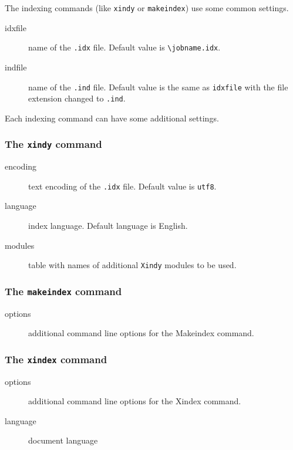The indexing commands (like \texttt{xindy} or \texttt{makeindex}) use
some common settings.

\begin{description}
\item[idxfile]
name of the \texttt{.idx} file. Default value is
\texttt{\textbackslash{}jobname.idx}.
\item[indfile]
name of the \texttt{.ind} file. Default value is the same as
\texttt{idxfile} with the file extension changed to \texttt{.ind}.
\end{description}

Each indexing command can have some additional settings.

\subsubsection{\texorpdfstring{The \texttt{xindy}
command}{The xindy command}}\label{the-xindy-command}

\begin{description}
\item[encoding]
text encoding of the \texttt{.idx} file. Default value is \texttt{utf8}.
\item[language]
index language. Default language is English.
\item[modules]
table with names of additional \texttt{Xindy} modules to be used.
\end{description}

\subsubsection{\texorpdfstring{The \texttt{makeindex}
command}{The makeindex command}}\label{the-makeindex-command}

\begin{description}
\item[options]
additional command line options for the Makeindex command.
\end{description}

\subsubsection{\texorpdfstring{The \texttt{xindex}
command}{The xindex command}}\label{the-xindex-command}

\begin{description}
\item[options]
additional command line options for the Xindex command.
\item[language]
document language
\end{description}

